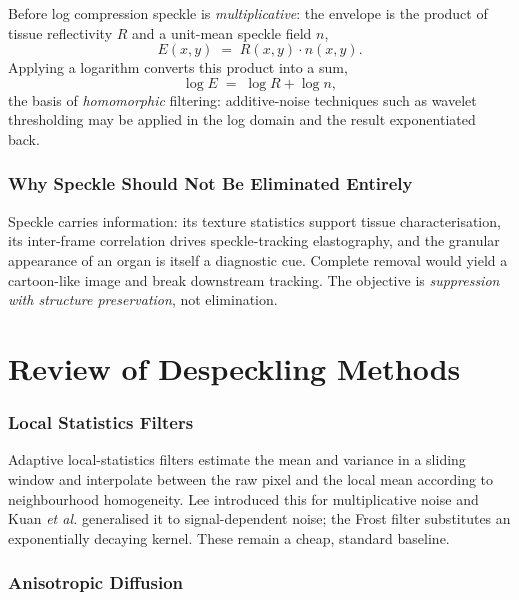 \documentclass[12pt,a4paper,oneside]{report}
\begin{document}
Before log compression speckle is \emph{multiplicative}: the envelope is the
product of tissue reflectivity $R$ and a unit-mean speckle field $n$,
\begin{equation}
E(x,y) \;=\; R(x,y)\cdot n(x,y).
\label{eq:multiplicative}
\end{equation}
Applying a logarithm converts this product into a sum,
\begin{equation}
\log E \;=\; \log R + \log n,
\label{eq:homomorphic}
\end{equation}
the basis of \emph{homomorphic} filtering: additive-noise techniques such as
wavelet thresholding may be applied in the log domain and the result
exponentiated back.

\subsubsection{Why Speckle Should Not Be Eliminated Entirely}

Speckle carries information: its texture statistics support tissue
characterisation, its inter-frame correlation drives speckle-tracking
elastography, and the granular appearance of an organ is itself a diagnostic cue.
Complete removal would yield a cartoon-like image and break downstream tracking.
The objective is \emph{suppression with structure preservation}, not elimination.

\section{Review of Despeckling Methods}

\subsubsection{Local Statistics Filters}

Adaptive local-statistics filters estimate the mean and variance in a sliding
window and interpolate between the raw pixel and the local mean according to
neighbourhood homogeneity. Lee \cite{lee1980digital} introduced this for
multiplicative noise and Kuan \emph{et al.} \cite{kuan1985adaptive} generalised it
to signal-dependent noise; the Frost filter substitutes an exponentially decaying
kernel. These remain a cheap, standard baseline.

\subsubsection{Anisotropic Diffusion}
\end{document}
